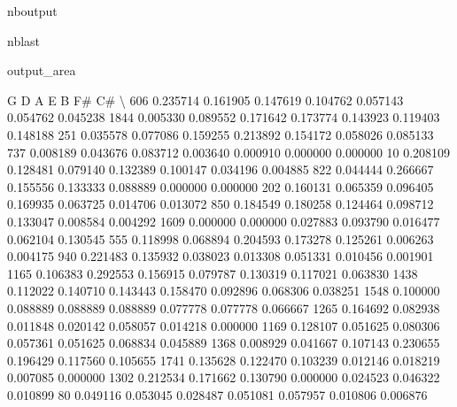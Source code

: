 \documentclass[letterpaper,10pt,english]{sphinxmanual}
\begin{document}
\begin{sphinxuseclass}{nboutput}
\begin{sphinxuseclass}{nblast}
{\begin{sphinxuseclass}{output_area}
\begin{sphinxuseclass}{}
\begin{sphinxVerbatim}[commandchars=\\\{\}]
             G         D         A         E         B        F\#        C\#  \textbackslash{}
606   0.235714  0.161905  0.147619  0.104762  0.057143  0.054762  0.045238
1844  0.005330  0.089552  0.171642  0.173774  0.143923  0.119403  0.148188
251   0.035578  0.077086  0.159255  0.213892  0.154172  0.058026  0.085133
737   0.008189  0.043676  0.083712  0.003640  0.000910  0.000000  0.000000
10    0.208109  0.128481  0.079140  0.132389  0.100147  0.034196  0.004885
822   0.044444  0.266667  0.155556  0.133333  0.088889  0.000000  0.000000
202   0.160131  0.065359  0.096405  0.169935  0.063725  0.014706  0.013072
850   0.184549  0.180258  0.124464  0.098712  0.133047  0.008584  0.004292
1609  0.000000  0.000000  0.027883  0.093790  0.016477  0.062104  0.130545
555   0.118998  0.068894  0.204593  0.173278  0.125261  0.006263  0.004175
940   0.221483  0.135932  0.038023  0.013308  0.051331  0.010456  0.001901
1165  0.106383  0.292553  0.156915  0.079787  0.130319  0.117021  0.063830
1438  0.112022  0.140710  0.143443  0.158470  0.092896  0.068306  0.038251
1548  0.100000  0.088889  0.088889  0.088889  0.077778  0.077778  0.066667
1265  0.164692  0.082938  0.011848  0.020142  0.058057  0.014218  0.000000
1169  0.128107  0.051625  0.080306  0.057361  0.051625  0.068834  0.045889
1368  0.008929  0.041667  0.107143  0.230655  0.196429  0.117560  0.105655
1741  0.135628  0.122470  0.103239  0.012146  0.018219  0.007085  0.000000
1302  0.212534  0.171662  0.130790  0.000000  0.024523  0.046322  0.010899
80    0.049116  0.053045  0.028487  0.051081  0.057957  0.010806  0.006876


\end{sphinxVerbatim}
\end{sphinxuseclass}
\end{sphinxuseclass}}
\end{sphinxuseclass}
\end{sphinxuseclass}
\end{document}
